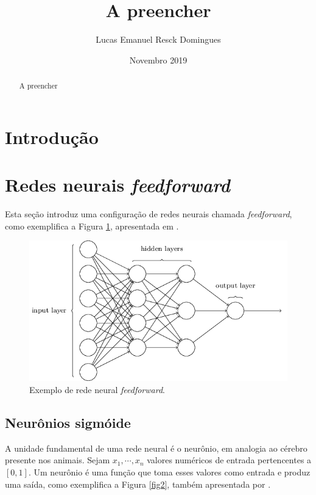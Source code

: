 \documentclass{article}
\title{A preencher}
\author{Lucas Emanuel Resck Domingues}
\date{Novembro 2019}
\begin{document}
    \maketitle

    \begin{abstract}
        A preencher
    \end{abstract}

    \tableofcontents

    \section{Introdução}

    \section{Redes neurais \textit{feedforward}}

        Esta seção introduz uma configuração de redes neurais chamada \textit{feedforward}, como exemplifica a Figura \ref{fig1}, apresentada em \cite{nielsen2015neural}.

        \begin{figure}[h!]
            \centering
            \includegraphics[scale=0.5]{Images/Feedforward neural network.png}
            \caption{Exemplo de rede neural \textit{feedforward}.}
            \label{fig1}
        \end{figure}        

        \subsection{Neurônios sigmóide}

            A unidade fundamental de uma rede neural é o neurônio, em analogia ao cérebro presente nos animais.
            Sejam $x_1, \cdots, x_n$ valores numéricos de entrada pertencentes a $[0, 1]$.
            Um neurônio é uma função que toma esses valores como entrada e produz uma saída, como exemplifica a Figura \ref{fig2}, também apresentada por \cite{nielsen2015neural}.
\end{document}

